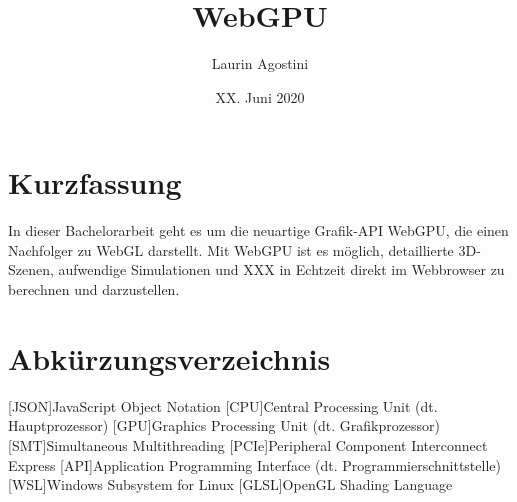 \documentclass[oneside]{ausarbeitung}
\begin{document}



\title{WebGPU}

\author{Laurin Agostini}

\date{XX. Juni 2020}

\maketitle
\cleardoublepage

\setcounter{page}{1}


\makeaffirmation
\cleardoublepage

\chapter*{Kurzfassung}
In dieser Bachelorarbeit geht es um die neuartige Grafik-API WebGPU, die einen Nachfolger zu WebGL darstellt. Mit WebGPU ist es möglich, detaillierte 3D-Szenen, aufwendige Simulationen und XXX in Echtzeit direkt im Webbrowser zu berechnen und darzustellen. 

\cleardoublepage
{}
\tableofcontents

\listoffigures

\listoftables

\lstlistoflistings

\chapter*{Abkürzungsverzeichnis}
\begin{acronym}[JSON]  %

[JSON]{JavaScript Object Notation}
[CPU]{Central Processing Unit (dt. Hauptprozessor)}
[GPU]{Graphics Processing Unit (dt. Grafikprozessor)}
[SMT]{Simultaneous Multithreading}
[PCIe]{Peripheral Component Interconnect Express}
[API]{Application Programming Interface (dt. Programmierschnittstelle)}
[WSL]{Windows Subsystem for Linux}
[GLSL]{OpenGL Shading Language}
\end{acronym}
\cleardoublepage
{}
\setcounter{page}{1}
\end{document}
